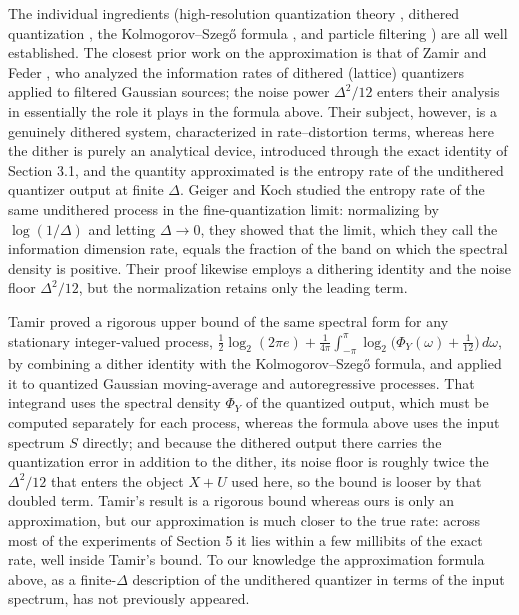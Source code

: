 \documentclass[11pt]{article}
\begin{document}
The individual ingredients (high-resolution quantization theory \cite{GrayNeuhoff1998}, dithered quantization \cite{GrayStockham1993,ZamirFeder1996}, the Kolmogorov--Szegő formula \cite{GrenanderSzego1958}, and particle filtering \cite{PittShephard1999}) are all well established. The closest prior work on the approximation is that of Zamir and Feder \cite{ZamirFeder1996}, who analyzed the information rates of dithered (lattice) quantizers applied to filtered Gaussian sources; the noise power \(\Delta^2/12\) enters their analysis in essentially the role it plays in the formula above. Their subject, however, is a genuinely dithered system, characterized in rate--distortion terms, whereas here the dither is purely an analytical device, introduced through the exact identity of Section 3.1, and the quantity approximated is the entropy rate of the undithered quantizer output at finite \(\Delta\). Geiger and Koch \cite{GeigerKoch2019} studied the entropy rate of the same undithered process in the fine-quantization limit: normalizing by \(\log(1/\Delta)\) and letting \(\Delta \to 0\), they showed that the limit, which they call the information dimension rate, equals the fraction of the band on which the spectral density is positive. Their proof likewise employs a dithering identity and the noise floor \(\Delta^2/12\), but the normalization retains only the leading term.

Tamir \cite{Tamir2023} proved a rigorous upper bound of the same spectral form for any stationary integer-valued process, \(\tfrac12\log_2(2\pi e) + \tfrac{1}{4\pi}\int_{-\pi}^{\pi}\log_2\big(\Phi_Y(\omega) + \tfrac{1}{12}\big)\,d\omega\), by combining a dither identity with the Kolmogorov--Szegő formula, and applied it to quantized Gaussian moving-average and autoregressive processes. That integrand uses the spectral density \(\Phi_Y\) of the quantized output, which must be computed separately for each process, whereas the formula above uses the input spectrum \(S\) directly; and because the dithered output there carries the quantization error in addition to the dither, its noise floor is roughly twice the \(\Delta^2/12\) that enters the object \(X + U\) used here, so the bound is looser by that doubled term. Tamir's result is a rigorous bound whereas ours is only an approximation, but our approximation is much closer to the true rate: across most of the experiments of Section 5 it lies within a few millibits of the exact rate, well inside Tamir's bound. To our knowledge the approximation formula above, as a finite-\(\Delta\) description of the undithered quantizer in terms of the input spectrum, has not previously appeared.
\end{document}
